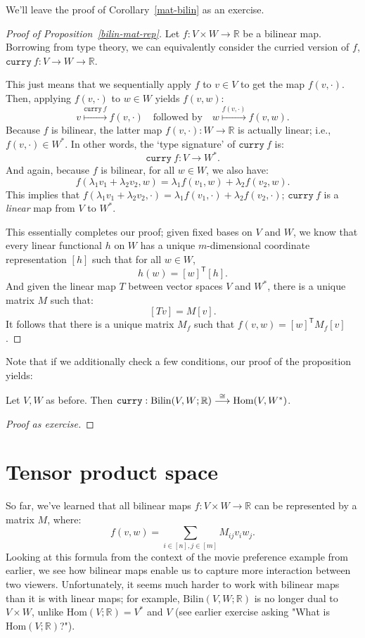 We'll leave the proof of Corollary~\ref{mat-bilin} as an exercise. 
\begin{proof}[Proof of Proposition~\ref{bilin-mat-rep}]
  Let $f : V \times W \to \mathbb{R}$ be a bilinear map. Borrowing from type theory, we can equivalently consider the curried version of $f$, $\texttt{curry}\ f : V \to W \to \mathbb{R}$.

  This just means that we sequentially apply $f$ to $v \in V$ to get  the map $f(v,\cdot)$. Then, applying $f(v,\cdot)$ to $w \in W$ yields $f(v,w)$:
  \[v \overset{\texttt{curry}\ f}{\longmapsto} f(v, \cdot) \quad \textrm{followed by} \quad w \overset{f(v,\cdot)}{\longmapsto} f(v,w).\]
  Because $f$ is bilinear, the latter map $f(v, \cdot) : W \to \mathbb{R}$ is actually linear; i.e., $f(v,\cdot) \in W^*$. In other words, the `type signature' of $\texttt{curry}\ f$ is:
  \[\texttt{curry}\ f : V \to W^*.\]
  And again, because $f$ is bilinear, for all $w \in W$, we also have:
  \[f(\lambda_1 v_1 + \lambda_2 v_2, w) = \lambda_1 f(v_1, w) + \lambda_2 f(v_2, w).\]
  This implies that $f(\lambda_1 v_1 + \lambda_2 v_2 , \cdot) = \lambda_1 f(v_1, \cdot) + \lambda_2 f(v_2,\cdot)$; $\texttt{curry}\ f$ is a \emph{linear} map from $V$ to $W^*$.

  This essentially completes our proof; given fixed bases on $V$ and $W$, we know that every linear functional $h$ on $W$ has a unique $m$-dimensional coordinate representation $[h]$ such that for all $w \in W$,
  \[h(w) = [w]^\mathsf{T}[h].\]
  And given the linear map $T$ between vector spaces $V$ and $W^*$, there is a unique matrix $M$ such that:
  \[[Tv] = M [v].\]
  It follows that there is a unique matrix $M_f$ such that $f(v,w) = [w]^\mathsf{T} M_f [v]$.
\end{proof}

Note that if we additionally check a few conditions, our proof of the proposition yields:
\begin{corollary}
  Let $V, W$ as before. Then $\textup{\texttt{curry}} : \mathrm{Bilin}(V, W;\mathbb{R}) \overset{\cong}{\longrightarrow} \mathrm{Hom}(V, W^*)$.
\end{corollary}
\begin{proof}[Proof as exercise]
\end{proof}

\section{Tensor product space}
So far, we've learned that all bilinear maps $f : V \times W \to \mathbb{R}$ can be represented by a matrix $M$, where:
\begin{equation}\label{bilinear-map-representation}
  f(v,w) = \sum_{i \in [n], j \in [m]} M_{ij} v_i w_j.
\end{equation}
Looking at this formula from the context of the movie preference example from earlier, we  see how bilinear maps enable us to capture more interaction between two viewers. Unfortunately, it seems much harder to work with bilinear maps than it is with linear maps; for example, $\mathrm{Bilin}(V,W;\mathbb{R})$ is no longer dual to $V \times W$, unlike $\mathrm{Hom}(V;\mathbb{R})=V^{*}$ and $V$ (see earlier exercise asking "What is $\mathrm{Hom}(V;\mathbb{R})$?").

